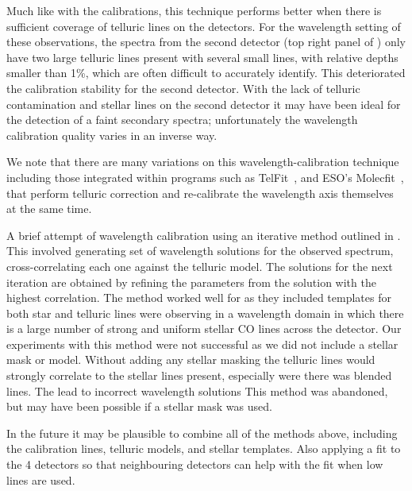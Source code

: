 Much like with the \thar{} calibrations, this technique performs better when there is sufficient coverage of telluric lines on the detectors. For the wavelength setting of these observations, the spectra from the second detector (top right panel of ) only have two large telluric lines present with several small lines, with relative depths smaller than 1\%, which are often difficult to accurately identify. This deteriorated the calibration stability for the second detector. With the lack of telluric contamination and stellar lines on the second detector it may have been ideal for the detection of a faint secondary spectra; unfortunately the wavelength calibration quality varies in an inverse way.


We note that there are many variations on this wavelength-calibration technique including those integrated within programs such as TelFit~\citet{gullikson_correcting_2014}, and ESO's Molecfit~\citet{smette_molecfit_2015}, that perform telluric correction and re-calibrate the wavelength axis themselves at the same time.


A brief attempt of wavelength calibration using an iterative method outlined in \cite{brogi_rotation_2016}. This involved generating set of wavelength solutions for the observed spectrum, cross-correlating each one against the telluric model. The solutions for the next iteration are obtained by refining the parameters from the solution with the highest correlation.
The method worked well for \citet{brogi_rotation_2016} as they included templates for both star and telluric lines were observing in a wavelength domain in which there is a large number of strong and uniform stellar CO lines across the detector.
Our experiments with this method were not successful as we did not include a stellar mask or model. Without adding any stellar masking the telluric lines would strongly correlate to the stellar lines present, especially were there was blended lines. The lead to incorrect wavelength solutions This method was abandoned, but may have been possible if a stellar mask was used.




In the future it may be plausible to combine all of the methods above, including the \thar{} calibration lines, telluric models, and stellar templates. Also applying a fit to the 4 detectors so that neighbouring detectors can help with the fit when low lines are used.

